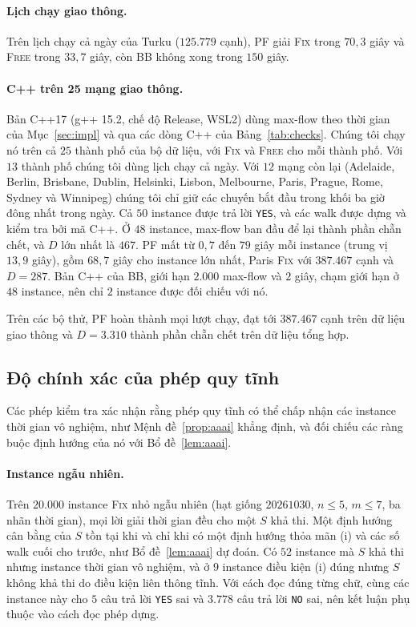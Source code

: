 \documentclass[pdflatex,sn-mathphys-num]{sn-jnl}
\theoremstyle{thmstyleone}%
\theoremstyle{thmstyletwo}%
\theoremstyle{thmstylethree}%
\newcommand{\FIX}{\textup{\textsc{Fix}}}
\newcommand{\FREE}{\textup{\textsc{Free}}}
\newcommand{\YES}{\texttt{YES}}
\newcommand{\NO}{\texttt{NO}}
\begin{document}
\paragraph{Lịch chạy giao thông.} Trên lịch chạy cả ngày của Turku ($125.779$ cạnh), PF giải \FIX{} trong $70{,}3$ giây và \FREE{} trong $33{,}7$ giây, còn BB không xong trong $150$ giây.

\paragraph{C++ trên 25 mạng giao thông.} Bản C++17 (g++ 15.2, chế độ Release, WSL2) dùng max-flow theo thời gian của Mục~\ref{sec:impl} và qua các dòng C++ của Bảng~\ref{tab:checks}. Chúng tôi chạy nó trên cả $25$ thành phố của bộ dữ liệu, với \FIX{} và \FREE{} cho mỗi thành phố. Với $13$ thành phố chúng tôi dùng lịch chạy cả ngày. Với $12$ mạng còn lại (Adelaide, Berlin, Brisbane, Dublin, Helsinki, Lisbon, Melbourne, Paris, Prague, Rome, Sydney và Winnipeg) chúng tôi chỉ giữ các chuyến bắt đầu trong khối ba giờ đông nhất trong ngày. Cả $50$ instance được trả lời \YES{}, và các walk được dựng và kiểm tra bởi mã C++. Ở $48$ instance, max-flow ban đầu để lại thành phần chẵn chết, và $D$ lớn nhất là $467$. PF mất từ $0{,}7$ đến $79$ giây mỗi instance (trung vị $13{,}9$ giây), gồm $68{,}7$ giây cho instance lớn nhất, Paris \FIX{} với $387.467$ cạnh và $D=287$. Bản C++ của BB, giới hạn $2.000$ max-flow và $2$ giây, chạm giới hạn ở $48$ instance, nên chỉ $2$ instance được đối chiếu với nó.

Trên các bộ thử, PF hoàn thành mọi lượt chạy, đạt tới $387.467$ cạnh trên dữ liệu giao thông và $D=3.310$ thành phần chẵn chết trên dữ liệu tổng hợp.

\subsection{Độ chính xác của phép quy tĩnh}\label{sec:exp-static}

Các phép kiểm tra xác nhận rằng phép quy tĩnh có thể chấp nhận các instance thời gian vô nghiệm, như Mệnh đề~\ref{prop:aaai} khẳng định, và đối chiếu các ràng buộc định hướng của nó với Bổ đề~\ref{lem:aaai}.

\paragraph{Instance ngẫu nhiên.} Trên $20.000$ instance \FIX{} nhỏ ngẫu nhiên (hạt giống $20261030$, $n\le5$, $m\le7$, ba nhãn thời gian), mọi lời giải thời gian đều cho một $S$ khả thi. Một định hướng cân bằng của $S$ tồn tại khi và chỉ khi có một định hướng thỏa mãn (i) và các số walk cuối cho trước, như Bổ đề~\ref{lem:aaai} dự đoán. Có $52$ instance mà $S$ khả thi nhưng instance thời gian vô nghiệm, và ở $9$ instance điều kiện (i) đúng nhưng $S$ không khả thi do điều kiện liên thông tĩnh. Với cách đọc đúng từng chữ, cùng các instance này cho $5$ câu trả lời \YES{} sai và $3.778$ câu trả lời \NO{} sai, nên kết luận phụ thuộc vào cách đọc phép dựng.
\end{document}

